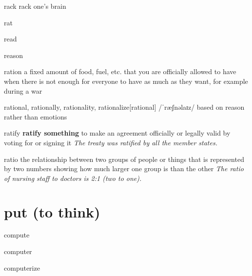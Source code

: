 \begin{DefWord}{rack}
    rack one's brain
\end{DefWord}

\begin{DefWord}{rat}
\end{DefWord}

\begin{DefWord}{read}
\end{DefWord}

\begin{DefWord}{reason}
\end{DefWord}

\begin{DefWord}{ration}
    a fixed amount of food, fuel, etc. that you are officially allowed to have when there is not enough for everyone to have as much as they want, for example during a war
\end{DefWord}

\begin{DefWord}{rational, rationally, rationality, rationalize}[rational]
    /ˈræʃnəlaɪz/
    based on reason rather than emotions
\end{DefWord}

\begin{DefWord}{ratify}
    \textbf{ratify something} to make an agreement officially or legally valid by voting for or signing it
    \textit{The treaty was ratified by all the member states.}
\end{DefWord}

\begin{DefWord}{ratio}
    the relationship between two groups of people or things that is represented by two numbers showing how much larger one group is than the other
    \textit{The ratio of nursing staff to doctors is 2:1 (two to one).}
\end{DefWord}

\section{put (to think)}

\begin{DefWord}{compute}
\end{DefWord}

\begin{DefWord}{computer}
\end{DefWord}

\begin{DefWord}{computerize}
\end{DefWord}

